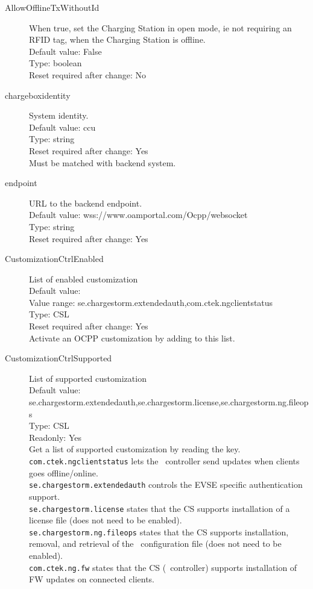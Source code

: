 \begin{description}
\item[AllowOfflineTxWithoutId] When true, set the Charging Station in open mode, ie not requiring an RFID tag, when the Charging Station is offline.\\
  Default value: False\\
  Type: boolean\\
  Reset required after change: No\\

\item[chargeboxidentity] System identity.\\
  Default value: ccu\\
  Type: string\\
  Reset required after change: Yes\\
  Must be matched with backend system.\\

\item[endpoint] URL to the backend endpoint.\\
  Default value: wss://www.oamportal.com/Ocpp/websocket\\
  Type: string\\
  Reset required after change: Yes\\

\item[CustomizationCtrlEnabled] List of enabled customization\\
  Default value: \\
  Value range: se.chargestorm.extendedauth,com.ctek.ngclientstatus\\
  Type: CSL\\
  Reset required after change: Yes\\
  Activate an OCPP customization by adding to this list.\\

\item[CustomizationCtrlSupported] List of supported customization\\
  Default value: se.chargestorm.extendedauth,se.chargestorm.license,se.chargestorm.ng.fileops\\
  Type: CSL\\
  Readonly: Yes\\
  Get a list of supported customization by reading the key. \\\verb|com.ctek.ngclientstatus| lets the \nanogrid\ controller send updates when clients goes offline/online. \\\verb|se.chargestorm.extendedauth| controls the EVSE specific authentication support. \\\verb|se.chargestorm.license| states that the CS supports installation of a license file (does not need to be enabled). \\\verb|se.chargestorm.ng.fileops| states that the CS supports installation, removal, and retrieval of the \nanogrid\ configuration file (does not need to be enabled). \\\verb|com.ctek.ng.fw| states that the CS (\nanogrid\ controller) supports installation of FW updates on connected clients.\\


\end{description}
